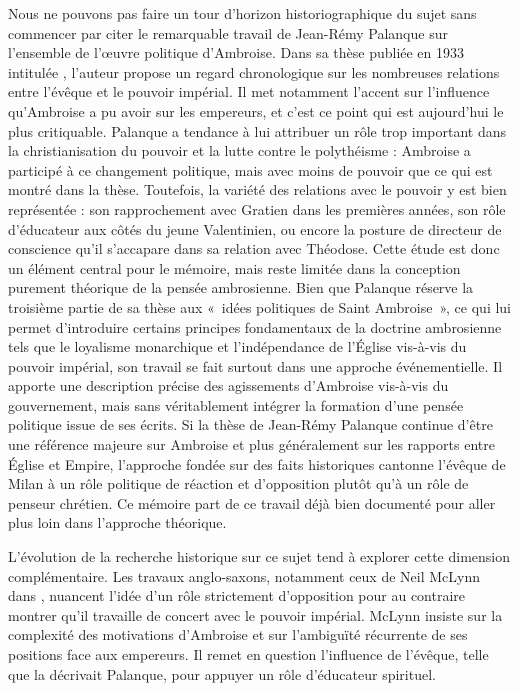 Nous ne pouvons pas faire un tour d’horizon historiographique du sujet sans commencer par citer le remarquable travail de Jean-Rémy Palanque sur l’ensemble de l'œuvre politique d’Ambroise. Dans sa thèse publiée en 1933 intitulée \autocite{palanque_ambroise}, l'auteur propose un regard chronologique sur les nombreuses relations entre l'évêque et le pouvoir impérial. Il met notamment l'accent sur l'influence qu'Ambroise a pu avoir sur les empereurs, et c'est ce point qui est aujourd'hui le plus critiquable. Palanque a tendance à lui attribuer un rôle trop important dans la christianisation du pouvoir et la lutte contre le polythéisme : Ambroise a participé à ce changement politique, mais avec moins de pouvoir que ce qui est montré dans la thèse. Toutefois, la variété des relations avec le pouvoir y est bien représentée : son rapprochement avec Gratien dans les premières années, son rôle d'éducateur aux côtés du jeune Valentinien, ou encore la posture de directeur de conscience qu'il s'accapare dans sa relation avec Théodose. Cette étude est donc un élément central pour le mémoire, mais reste limitée dans la conception purement théorique de la pensée ambrosienne. Bien que Palanque réserve la troisième partie de sa thèse aux «~idées politiques de Saint Ambroise~», ce qui lui permet d’introduire certains principes fondamentaux de la doctrine ambrosienne tels que le loyalisme monarchique\autocite[345]{palanque_ambroise} et l'indépendance de l'Église vis-à-vis du pouvoir impérial\autocite[370]{palanque_ambroise}, son travail se fait surtout dans une approche événementielle. Il apporte une description précise des agissements d'Ambroise vis-à-vis du gouvernement, mais sans véritablement intégrer la formation d'une pensée politique issue de ses écrits. Si la thèse de Jean-Rémy Palanque continue d’être une référence majeure sur Ambroise et plus généralement sur les rapports entre Église et Empire, l’approche fondée sur des faits historiques cantonne l’évêque de Milan à un rôle politique de réaction et d’opposition plutôt qu’à un rôle de penseur chrétien. Ce mémoire part de ce travail déjà bien documenté pour aller plus loin dans l'approche théorique.

\bigskip

L’évolution de la recherche historique sur ce sujet tend à explorer cette dimension complémentaire. Les travaux anglo-saxons, notamment ceux de Neil McLynn dans \autocite{mclynn_ambrose}, nuancent l'idée d'un rôle strictement d'opposition pour au contraire montrer qu'il travaille de concert avec le pouvoir impérial. McLynn insiste sur la complexité des motivations d'Ambroise et sur l'ambiguïté récurrente de ses positions face aux empereurs. Il remet en question l'influence de l'évêque, telle que la décrivait Palanque, pour appuyer un rôle d'éducateur spirituel.

